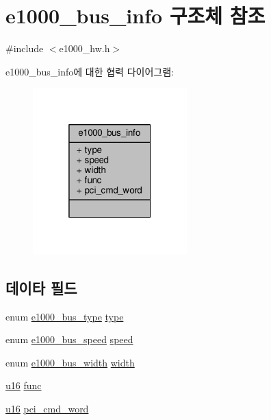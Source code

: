 \hypertarget{structe1000__bus__info}{}\section{e1000\+\_\+bus\+\_\+info 구조체 참조}
\label{structe1000__bus__info}


{\ttfamily \#include $<$e1000\+\_\+hw.\+h$>$}



e1000\+\_\+bus\+\_\+info에 대한 협력 다이어그램\+:
\nopagebreak
\begin{figure}[H]
\begin{center}
\leavevmode
\includegraphics[width=169pt]{structe1000__bus__info__coll__graph}
\end{center}
\end{figure}
\subsection*{데이타 필드}
\begin{DoxyCompactItemize}
\item 
enum \hyperlink{kmod_2igb_2e1000__hw_8h_a4e6322e180969c21be0c72654ef07423}{e1000\+\_\+bus\+\_\+type} \hyperlink{structe1000__bus__info_a1d586fc95f0743ade8be0fa150e61135}{type}
\item 
enum \hyperlink{kmod_2igb_2e1000__hw_8h_a7724e6e38084d6f3d5ad19138462aaa4}{e1000\+\_\+bus\+\_\+speed} \hyperlink{structe1000__bus__info_a4b59af6a3a89438279fb7944d1b74f8f}{speed}
\item 
enum \hyperlink{kmod_2igb_2e1000__hw_8h_a29097584be713aeabbdb98b320e9bfe6}{e1000\+\_\+bus\+\_\+width} \hyperlink{structe1000__bus__info_af18553c0e03f32b4280b24a1ab40071a}{width}
\item 
\hyperlink{lib_2igb_2e1000__osdep_8h_acdc9cf0314be0ae5a01d6d4379a95edd}{u16} \hyperlink{structe1000__bus__info_aa0e8a98481733fa11b6a46a53b2a3e41}{func}
\item 
\hyperlink{lib_2igb_2e1000__osdep_8h_acdc9cf0314be0ae5a01d6d4379a95edd}{u16} \hyperlink{structe1000__bus__info_abb56f96e770a8e41d7f0de05f2a93a33}{pci\+\_\+cmd\+\_\+word}
\end{DoxyCompactItemize}


